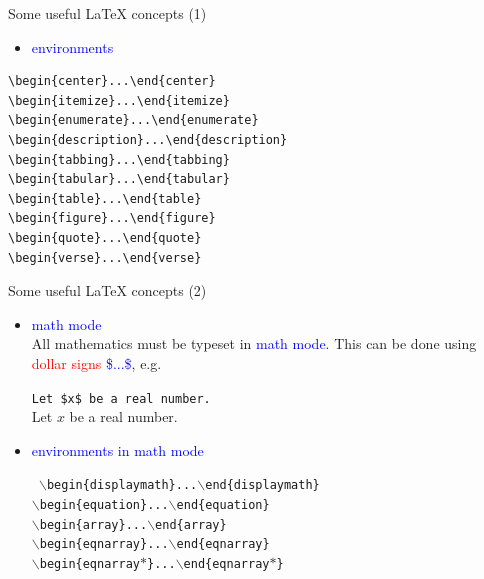 \documentclass{beamer}
\newcommand{\bc}{\begin{center}}
\newcommand{\ec}{\end{center}}
\newcommand{\lx}{{\LaTeX} }
\def\mynormal{\vspace*{-0.5cm}}
\begin{document}
\begin{frame}[fragile]{Some useful \lx concepts (1)}
\mynormal
\medskip
\begin{itemize}
\item \textcolor{blue}{environments}
\end{itemize}
\begin{lstlisting}
\begin{center}...\end{center}
\begin{itemize}...\end{itemize}
\begin{enumerate}...\end{enumerate}
\begin{description}...\end{description}
\begin{tabbing}...\end{tabbing}
\begin{tabular}...\end{tabular}
\begin{table}...\end{table}
\begin{figure}...\end{figure}
\begin{quote}...\end{quote}
\begin{verse}...\end{verse}
\end{lstlisting}
\begin{flushright}
\end{flushright}
\end{frame}

\begin{frame}{Some useful \lx concepts (2)}
\mynormal
\medskip
\begin{itemize}
\item \textcolor{blue}{math mode}\\

All mathematics must be typeset in \textcolor{blue}{math mode}. This can be 
done 
using \textcolor{red}{dollar signs} \textcolor{blue}{\$...\$}, e.g.
\bc
{\tt Let \$x\$ be a real number.}\\
\medskip
 Let $x$ be a real number.
\ec
\medskip
\pause
\item \textcolor{blue}{environments in math mode}\\
\bc
\tt
$\backslash$begin\{displaymath\}...$\backslash$end\{displaymath\}\\
$\backslash$begin\{equation\}...$\backslash$end\{equation\}\\
$\backslash$begin\{array\}...$\backslash$end\{array\}\\
$\backslash$begin\{eqnarray\}...$\backslash$end\{eqnarray\}\\
$\backslash$begin\{eqnarray$\ast$\}...$\backslash$end\{eqnarray$\ast$\}\\
\ec
\end{itemize}
\end{frame}
\end{document}
